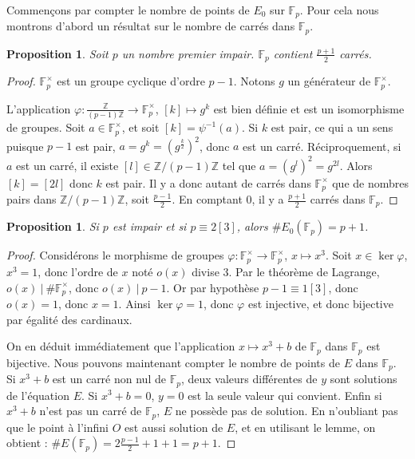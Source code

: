 \documentclass{article}
\theoremstyle{plain}%
\newtheorem{prop}[thm]{Proposition}
\theoremstyle{definition}%
\newcommand{\F}{\mathbb{F}}
\newcommand{\Z}{\mathbb{Z}}
\begin{document}
Commençons par compter le nombre de points de $E_0$ sur $\F_{p}$. Pour cela nous montrons d'abord un résultat sur le nombre de carrés dans $\F_{p}$.

\begin{prop}
  Soit $p$ un nombre premier impair. $\F_{p}$ contient $\frac{p+1}{2}$ carrés.
\end{prop}

\begin{proof}
  $\F_{p}^\times$ est un groupe cyclique d'ordre $p-1$. 
  Notons $g$ un générateur de $\F_{p}^\times$. 
  
  L'application $ \varphi \colon \frac{\Z}{(p-1)\Z} \to \F_{p}^\times$,
  $[k] \mapsto g^k$
  est bien définie et est un isomorphisme de groupes.
  Soit $a\in \F_{p}^\times$, et soit $[k] = \psi^{-1}(a)$.
  Si $k$ est pair, ce qui a un sens puisque $p-1$ est pair, $a = g^k = (g^\frac{k}{2})^2$, donc $a$ est un carré.
  Réciproquement, si $a$ est un carré, il existe $[l]\in \Z/(p-1)\Z$ tel que $a = (g^l)^2 = g^{2l}$.
  Alors $[k] = [2l]$ donc $k$ est pair.
  Il y a donc autant de carrés dans $\F_{p}^\times$ que de nombres pairs dans $\Z/{(p-1)\Z}$, soit $\frac{p-1}{2}$. 
  En comptant $0$, il y a $\frac{p+1}{2}$ carrés dans $\F_{p}$. 
\end{proof}

\begin{prop}
  Si $p$ est impair et si $p \equiv 2 [3]$, alors $\#E_0(\F_{p}) = p+1$.
\end{prop}

\begin{proof}
  Considérons le morphisme de groupes $\varphi \colon \F_{p}^\times \to \F_{p}^\times$, $x \mapsto x^3$. 
  Soit $x\in \ker \varphi$, $x^3 = 1$, donc l'ordre de $x$ noté $o(x)$ divise $3$. 
  Par le théorème de Lagrange, $o(x)\ |\ \#\F_{p}^\times$, donc $o(x)\ |\ p-1$. 
  Or par hypothèse $p-1\equiv 1[3]$, donc $o(x) = 1$, donc $x = 1$.
  Ainsi $\ker \varphi = {1}$, donc $\varphi$ est injective, et donc bijective par égalité des cardinaux.

  On en déduit immédiatement que l'application $x \mapsto x^3 + b$ de $\F_{p}$ dans $\F_{p}$ est bijective.
  Nous pouvons maintenant compter le nombre de points de $E$ dans $\F_{p}$. 
  Si $x^3 + b$ est un carré non nul de $\F_{p}$, deux valeurs différentes de $y$ sont solutions de l'équation $E$. 
  Si $x^3 + b = 0$, $y = 0$ est la seule valeur qui convient.
  Enfin si $x^3 + b$ n'est pas un carré de $\F_{p}$, $E$ ne possède pas de solution.
  En n'oubliant pas que le point à l'infini $O$ est aussi solution de $E$, et en utilisant le lemme, on obtient : $\#E(\F_{p}) = 2\frac{p-1}{2} + 1 + 1 = p+1$.
\end{proof}
\end{document}
